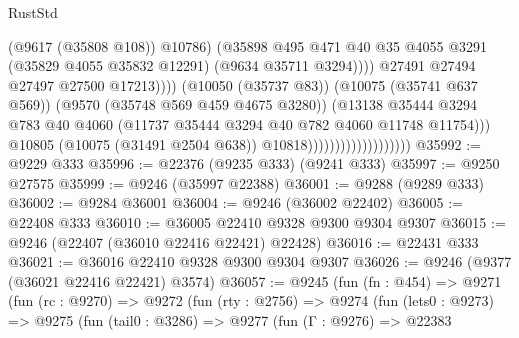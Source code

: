 \begin{lexlean}{RustStd}
\begin{coremodule}
                                                          (@9617 (@35808 @108))
                                                          @10786)
                                                        (@35898
                                                          @495
                                                          @471
                                                          @40
                                                          @35
                                                          @4055
                                                          @3291
                                                          (@35829 @4055 @35832 @12291)
                                                          (@9634 @35711 @3294))))
                                                    @27491
                                                    @27494
                                                    @27497
                                                    @27500
                                                    @17213))))
                                            (@10050 (@35737 @83))
                                            (@10075 (@35741 @637 @569))
                                            (@9570 (@35748 @569 @459 @4675 @3280))
                                            (@13138
                                              @35444
                                              @3294
                                              @783
                                              @40
                                              @4060
                                              (@11737 @35444 @3294 @40 @782 @4060 @11748 @11754)))
                                          @10805
                                          (@10075 (@31491 @2504 @638))
                                          @10818)))))))))))))))))))
@35992 := @9229 @333
@35996 := @22376 (@9235 @333) (@9241 @333)
@35997 := @9250 @27575
@35999 := @9246 (@35997 @22388)
@36001 := @9288 (@9289 @333)
@36002 := @9284 @36001
@36004 := @9246 (@36002 @22402)
@36005 := @22408 @333
@36010 := @36005 @22410 @9328 @9300 @9304 @9307
@36015 := @9246 (@22407 (@36010 @22416 @22421) @22428)
@36016 := @22431 @333
@36021 := @36016 @22410 @9328 @9300 @9304 @9307
@36026 := @9246 (@9377 (@36021 @22416 @22421) @3574)
@36057 := @9245
    (fun (fn : @454) =>
    @9271
      (fun (rc : @9270) =>
      @9272
        (fun (rty : @2756) =>
        @9274
          (fun (lets0 : @9273) =>
          @9275
            (fun (tail0 : @3286) =>
            @9277
              (fun (Γ : @9276) =>
              @22383

\end{coremodule}
\end{lexlean}
